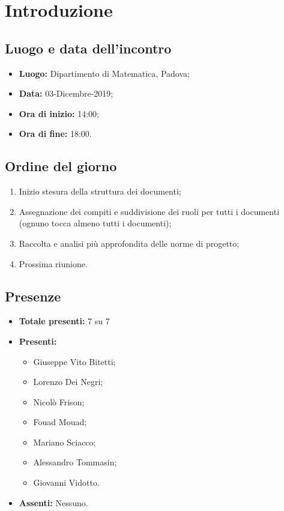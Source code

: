 \section*{Introduzione}

\subsection*{Luogo e data dell'incontro}
	\begin{itemize}
		\item \textbf{Luogo:} Dipartimento di Matematica, Padova;
		\item \textbf{Data:} 03-Dicembre-2019;
		\item \textbf{Ora di inizio:} 14:00;
		\item \textbf{Ora di fine:} 18:00.
	\end{itemize}

\subsection*{Ordine del giorno}
	\begin{enumerate}
		\item Inizio stesura della struttura dei documenti;
		\item Assegnazione dei compiti e suddivisione dei ruoli per tutti i documenti (ognuno tocca almeno tutti i documenti);
		\item Raccolta e analisi più approfondita delle norme di progetto;
		\item Prossima riunione.
	\end{enumerate}

\subsection*{Presenze}
	\begin{itemize}
		\item \textbf{Totale presenti:} 7 su 7
		\item \textbf{Presenti: }
			\begin{itemize}			
				\item Giuseppe Vito Bitetti;
				\item Lorenzo Dei Negri;
				\item Nicolò Frison;
				\item Fouad Mouad;
				\item Mariano Sciacco;
				\item Alessandro Tommasin;
				\item Giovanni Vidotto.
			\end{itemize}
		\item \textbf{Assenti: } 
			Nessuno.
	\end{itemize}



